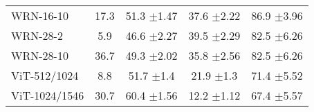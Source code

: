 \begin{center}
\begin{minipage}{0.47\textwidth}
\begin{table}[H]
{\begin{tabular}{@{}lcccc@{}}
WRN-16-10 & 17.3 & 51.3 $\pm$1.47 & 37.6 $\pm$2.22 & 86.9 $\pm$3.96 \\
WRN-28-2 & 5.9 & 46.6 $\pm$2.27 & 39.5 $\pm$2.29 & 82.5 $\pm$6.26 \\
WRN-28-10 & 36.7 & 49.3 $\pm$2.02 & 35.8 $\pm$2.56 & 82.5 $\pm$6.26 \\ \midrule
ViT-512/1024 & 8.8 & 51.7 $\pm$1.4 & 21.9 $\pm$1.3 & 71.4 $\pm$5.52 \\
ViT-1024/1546 & 30.7 & 60.4 $\pm$1.56 & 12.2 $\pm$1.12 & 67.4 $\pm$5.57 \\ \bottomrule
\end{tabular}%
}
\end{table}
\end{minipage}\hfill
\begin{minipage}{0.472\textwidth}
\centering
\captionsetup{type=table}
\begin{table}[H]
\centering
\caption{Split ImageNet-1K: the learning and retention capabilities can vary significantly across different architectures.}
\label{tab:imagenet-comp-all}
\end{table}
\end{minipage}
\end{center}
